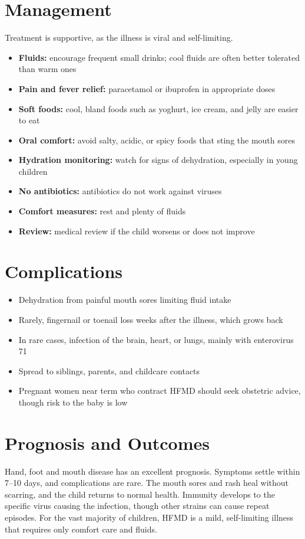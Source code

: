 \section*{Management}
Treatment is supportive, as the illness is viral and self-limiting.

\begin{itemize}
    \item \textbf{Fluids:} encourage frequent small drinks; cool fluids are often better tolerated than warm ones
    \item \textbf{Pain and fever relief:} paracetamol or ibuprofen in appropriate doses
    \item \textbf{Soft foods:} cool, bland foods such as yoghurt, ice cream, and jelly are easier to eat
    \item \textbf{Oral comfort:} avoid salty, acidic, or spicy foods that sting the mouth sores
    \item \textbf{Hydration monitoring:} watch for signs of dehydration, especially in young children
    \item \textbf{No antibiotics:} antibiotics do not work against viruses
    \item \textbf{Comfort measures:} rest and plenty of fluids
    \item \textbf{Review:} medical review if the child worsens or does not improve
\end{itemize}

\section*{Complications}
\begin{itemize}
    \item Dehydration from painful mouth sores limiting fluid intake
    \item Rarely, fingernail or toenail loss weeks after the illness, which grows back
    \item In rare cases, infection of the brain, heart, or lungs, mainly with enterovirus 71
    \item Spread to siblings, parents, and childcare contacts
    \item Pregnant women near term who contract HFMD should seek obstetric advice, though risk to the baby is low
\end{itemize}

\section*{Prognosis and Outcomes}
Hand, foot and mouth disease has an excellent prognosis. Symptoms settle within 7--10 days, and complications are rare. The mouth sores and rash heal without scarring, and the child returns to normal health. Immunity develops to the specific virus causing the infection, though other strains can cause repeat episodes. For the vast majority of children, HFMD is a mild, self-limiting illness that requires only comfort care and fluids.

